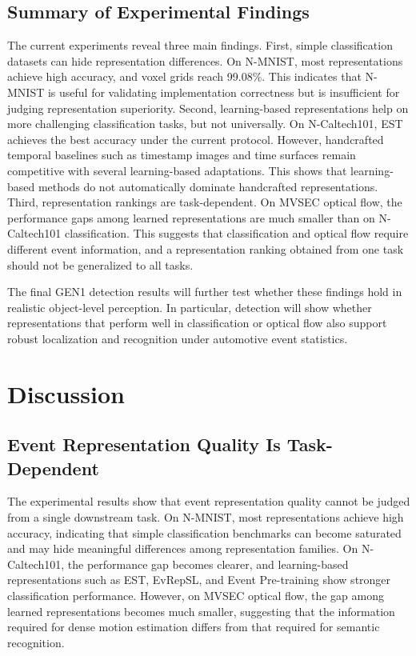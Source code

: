 \documentclass[letterpaper]{article}
\begin{document}
\subsection{Summary of Experimental Findings}
The current experiments reveal three main findings. First, simple classification datasets can hide representation differences. On N-MNIST, most representations achieve high accuracy, and voxel grids reach 99.08\%. This indicates that N-MNIST is useful for validating implementation correctness but is insufficient for judging representation superiority. Second, learning-based representations help on more challenging classification tasks, but not universally. On N-Caltech101, EST achieves the best accuracy under the current protocol. However, handcrafted temporal baselines such as timestamp images and time surfaces remain competitive with several learning-based adaptations. This shows that learning-based methods do not automatically dominate handcrafted representations. Third, representation rankings are task-dependent. On MVSEC optical flow, the performance gaps among learned representations are much smaller than on N-Caltech101 classification. This suggests that classification and optical flow require different event information, and a representation ranking obtained from one task should not be generalized to all tasks.

The final GEN1 detection results will further test whether these findings hold in realistic object-level perception. In particular, detection will show whether representations that perform well in classification or optical flow also support robust localization and recognition under automotive event statistics.

\section{Discussion}
\subsection{Event Representation Quality Is Task-Dependent}
The experimental results show that event representation quality cannot be judged from a single downstream task. On N-MNIST, most representations achieve high accuracy, indicating that simple classification benchmarks can become saturated and may hide meaningful differences among representation families. On N-Caltech101, the performance gap becomes clearer, and learning-based representations such as EST, EvRepSL, and Event Pre-training show stronger classification performance. However, on MVSEC optical flow, the gap among learned representations becomes much smaller, suggesting that the information required for dense motion estimation differs from that required for semantic recognition.
\end{document}
